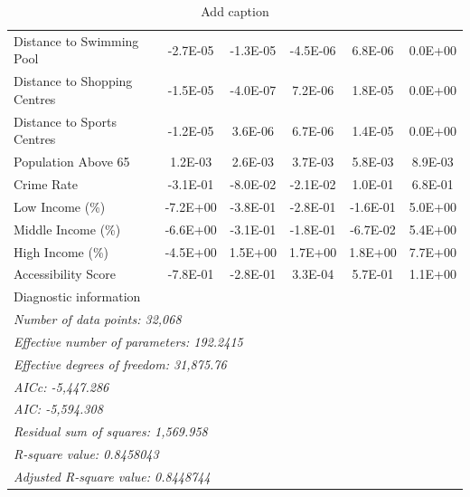 \begin{table}[!ht]
\begin{tabular}{lccccc}
    Distance to Swimming Pool & \multicolumn{1}{c}{-2.7E-05} & \multicolumn{1}{c}{-1.3E-05} & \multicolumn{1}{c}{-4.5E-06} & \multicolumn{1}{c}{6.8E-06} & \multicolumn{1}{c}{0.0E+00} \\
    Distance to Shopping Centres & \multicolumn{1}{c}{-1.5E-05} & \multicolumn{1}{c}{-4.0E-07} & \multicolumn{1}{c}{7.2E-06} & \multicolumn{1}{c}{1.8E-05} & \multicolumn{1}{c}{0.0E+00} \\
    Distance to Sports Centres & \multicolumn{1}{c}{-1.2E-05} & \multicolumn{1}{c}{3.6E-06} & \multicolumn{1}{c}{6.7E-06} & \multicolumn{1}{c}{1.4E-05} & \multicolumn{1}{c}{0.0E+00} \\
    Population Above 65 & \multicolumn{1}{c}{1.2E-03} & \multicolumn{1}{c}{2.6E-03} & \multicolumn{1}{c}{3.7E-03} & \multicolumn{1}{c}{5.8E-03} & \multicolumn{1}{c}{8.9E-03} \\
    Crime Rate & \multicolumn{1}{c}{-3.1E-01} & \multicolumn{1}{c}{-8.0E-02} & \multicolumn{1}{c}{-2.1E-02} & \multicolumn{1}{c}{1.0E-01} & \multicolumn{1}{c}{6.8E-01} \\
    Low Income (\%) & \multicolumn{1}{c}{-7.2E+00} & \multicolumn{1}{c}{-3.8E-01} & \multicolumn{1}{c}{-2.8E-01} & \multicolumn{1}{c}{-1.6E-01} & \multicolumn{1}{c}{5.0E+00} \\
    Middle Income (\%) & \multicolumn{1}{c}{-6.6E+00} & \multicolumn{1}{c}{-3.1E-01} & \multicolumn{1}{c}{-1.8E-01} & \multicolumn{1}{c}{-6.7E-02} & \multicolumn{1}{c}{5.4E+00} \\
    High Income (\%) & \multicolumn{1}{c}{-4.5E+00} & \multicolumn{1}{c}{1.5E+00} & \multicolumn{1}{c}{1.7E+00} & \multicolumn{1}{c}{1.8E+00} & \multicolumn{1}{c}{7.7E+00} \\
    Accessibility Score & \multicolumn{1}{c}{-7.8E-01} & \multicolumn{1}{c}{-2.8E-01} & \multicolumn{1}{c}{3.3E-04} & \multicolumn{1}{c}{5.7E-01} & \multicolumn{1}{c}{1.1E+00} \\
    \midrule
    Diagnostic information &       &       &       &       &  \\
    \multicolumn{6}{l}{\textit{Number of data points: 32,068 }} \\
    \multicolumn{6}{l}{\textit{Effective number of parameters: 192.2415 }} \\
    \multicolumn{6}{l}{\textit{Effective degrees of freedom: 31,875.76 }} \\
    \multicolumn{6}{l}{\textit{AICc: -5,447.286 }} \\
    \multicolumn{6}{l}{\textit{AIC: -5,594.308 }} \\
    \multicolumn{6}{l}{\textit{Residual sum of squares: 1,569.958 }} \\
    \multicolumn{6}{l}{\textit{R-square value:  0.8458043 }} \\
    \multicolumn{6}{l}{\textit{Adjusted R-square value:  0.8448744}} \\
    \end{tabular}%
    \caption{Add caption}
  \label{tab:GWR_coeffs}%
\end{table}


